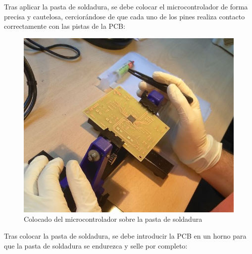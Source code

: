 \begin{itemize}
    Tras aplicar la pasta de soldadura, se debe colocar el microcontrolador de forma precisa y cautelosa, cerciorándose de que cada uno de los pines realiza contacto correctamente con las pistas de la PCB:
    
    \begin{figure}[H]
    \centering 
    \includegraphics[width=0.55\linewidth]{pictures/ColocadoSMD.jpg}
    \caption{Colocado del microcontrolador sobre la pasta de soldadura}
    \label{fig:kdiagram}
    \end{figure}

    Tras colocar la pasta de soldadura, se debe introducir la PCB en un horno para que la pasta de soldadura se endurezca y selle por completo:
    

\end{itemize}
